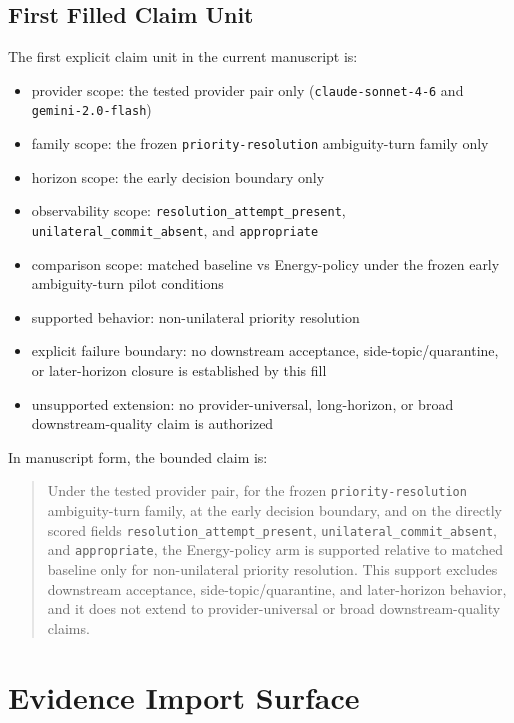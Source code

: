 \documentclass[11pt]{article}
\begin{document}
\subsection{First Filled Claim Unit}

The first explicit claim unit in the current manuscript is:

\begin{itemize}
\item provider scope:
  the tested provider pair only (\texttt{claude-sonnet-4-6} and
  \texttt{gemini-2.0-flash})
\item family scope:
  the frozen \texttt{priority-resolution} ambiguity-turn family only
\item horizon scope:
  the early decision boundary only
\item observability scope:
  \texttt{resolution\_attempt\_present},
  \texttt{unilateral\_commit\_absent}, and \texttt{appropriate}
\item comparison scope:
  matched baseline vs Energy-policy under the frozen early
  ambiguity-turn pilot conditions
\item supported behavior:
  non-unilateral priority resolution
\item explicit failure boundary:
  no downstream acceptance, side-topic/quarantine, or later-horizon closure is
  established by this fill
\item unsupported extension:
  no provider-universal, long-horizon, or broad downstream-quality claim is
  authorized
\end{itemize}

In manuscript form, the bounded claim is:

\begin{quote}
Under the tested provider pair, for the frozen \texttt{priority-resolution}
ambiguity-turn family, at the early decision boundary, and on the directly scored
fields \texttt{resolution\_attempt\_present},
\texttt{unilateral\_commit\_absent}, and \texttt{appropriate}, the Energy-policy
arm is supported relative to matched baseline only for non-unilateral priority
resolution. This support excludes downstream acceptance, side-topic/quarantine,
and later-horizon behavior, and it does not extend to provider-universal or broad
downstream-quality claims.
\end{quote}

\section{Evidence Import Surface}
\end{document}
